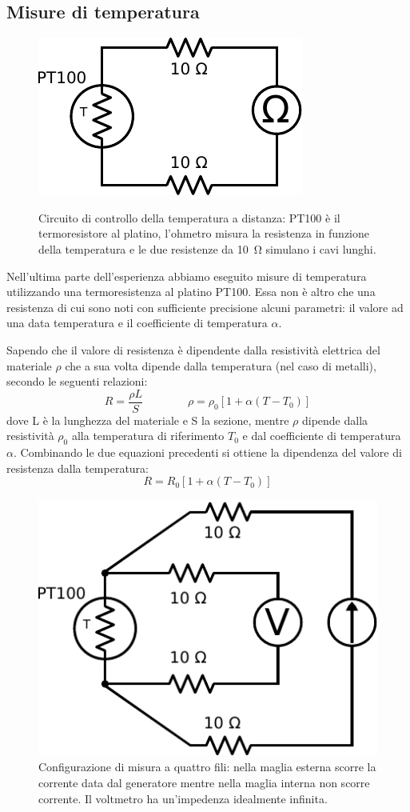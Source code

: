 \newpage
\subsection{Misure di temperatura}

\begin{figure}
\centering
\caption{Circuito di controllo della temperatura a distanza: PT100 è il termoresistore al platino, l'ohmetro misura la resistenza in funzione della temperatura e le due resistenze da \SI{10}{\ohm} simulano i cavi lunghi.}
\includegraphics[width=.25\textwidth]{../E05/latex/c_PT100_2wire.pdf}
\label{cir5:2wire}
\end{figure}

Nell'ultima parte dell'esperienza abbiamo eseguito misure di temperatura utilizzando una termoresistenza al platino PT100.
Essa non è altro che una resistenza di cui sono noti con sufficiente precisione alcuni parametri: il valore ad una data temperatura e il coefficiente di temperatura $\alpha$.

Sapendo che il valore di resistenza è dipendente dalla resistività elettrica del materiale $\rho$ che a sua volta dipende dalla temperatura (nel caso di metalli), secondo le seguenti relazioni:
	$$	R = \frac{\rho L}{S}
			\qquad \qquad
		\rho = \rho_0 \left[ 1 + \alpha \left( T - T_0 \right) \right]$$
dove L è la lunghezza del materiale e S la sezione, mentre $\rho$ dipende dalla resistività $\rho_0$ alla temperatura di riferimento $T_0$ e dal coefficiente di temperatura $\alpha$.
Combinando le due equazioni precedenti si ottiene la dipendenza del valore di resistenza dalla temperatura:
\begin{equation}
R = R_0 \left[ 1 + \alpha \left( T - T_0 \right) \right]
\end{equation}

\begin{figure}
\centering
\includegraphics[width=.3\textwidth]{../E05/latex/c_PT100_4wire.pdf}
\caption{Configurazione di misura a quattro fili: nella maglia esterna scorre la corrente data dal generatore mentre nella maglia interna non scorre corrente. Il voltmetro ha un'impedenza idealmente infinita.}
\label{cir5:4wire}
\end{figure}

